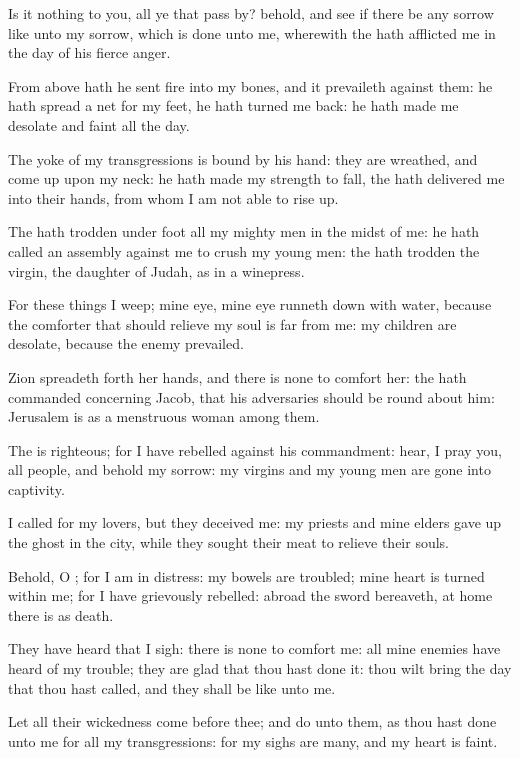 \verse Is it nothing to you, all ye that pass by? behold, and see if there be any sorrow like unto my sorrow, which is done unto me, wherewith the \LORD hath afflicted me in the day of his fierce anger.

\verse From above hath he sent fire into my bones, and it prevaileth against them: he hath spread a net for my feet, he hath turned me back: he hath made me desolate and faint all the day.

\verse The yoke of my transgressions is bound by his hand: they are wreathed, and come up upon my neck: he hath made my strength to fall, the \LORD hath delivered me into their hands, from whom I am not able to rise up.

\verse The \LORD hath trodden under foot all my mighty men in the midst of me: he hath called an assembly against me to crush my young men: the \LORD hath trodden the virgin, the daughter of Judah, as in a winepress.

\verse For these things I weep; mine eye, mine eye runneth down with water, because the comforter that should relieve my soul is far from me: my children are desolate, because the enemy prevailed.

\verse Zion spreadeth forth her hands, and there is none to comfort her: the \LORD hath commanded concerning Jacob, that his adversaries should be round about him: Jerusalem is as a menstruous woman among them.

\verse The \LORD is righteous; for I have rebelled against his commandment: hear, I pray you, all people, and behold my sorrow: my virgins and my young men are gone into captivity.

\verse I called for my lovers, but they deceived me: my priests and mine elders gave up the ghost in the city, while they sought their meat to relieve their souls.

\verse Behold, O \LORD; for I am in distress: my bowels are troubled; mine heart is turned within me; for I have grievously rebelled: abroad the sword bereaveth, at home there is as death.

\verse They have heard that I sigh: there is none to comfort me: all mine enemies have heard of my trouble; they are glad that thou hast done it: thou wilt bring the day that thou hast called, and they shall be like unto me.

\verse Let all their wickedness come before thee; and do unto them, as thou hast done unto me for all my transgressions: for my sighs are many, and my heart is faint.


